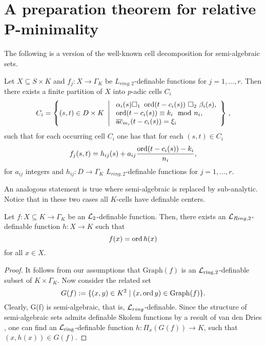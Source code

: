 \section{A preparation theorem for relative P-minimality}

The following is a version of the well-known cell decomposition for semi-algebraic sets. 

\begin{prop}\label{prop.celldecomp}
Let $X \subseteq  S \times K$ and $f_j:X \to\Gamma_K $ be $L_{ring,2}$-definable functions for $j=1,\ldots,r$. Then there exists a finite partition of $X$ into $p$-adic cells $C_i$ 
\[C_i = \left\{(s,t) \in D\times K \ \left| \ \begin{array}{l} \alpha_i(s) \square_1 \ \ord(t-c_i(s)) \ \square_2 \ \beta_i(s),\\ \ord(t-c_i(s)) \equiv k_i\mod n_i,\\ \ac_{m_i}(t-c_i(s)) = \xi_i \end{array} \right\}\right.,\]
such that for each occurring cell $C_i$ one has that for each $(s,t)\in C_i$
\[f_j(s,t)=  h_{ij}(s)+ a_{ij}\frac{\operatorname{ord}(t- c_i(s))- k_i}{n_i},
\]
for $a_{ij}$ integers and $h_{ij}: D\to \Gamma_K$ $L_{ring,2}$-definable functions for $j=1,\ldots,r$. 
\end{prop}

An analogous statement is true where semi-algebraic is replaced by sub-analytic. Notice that in these two cases all $K$-cells have definable centers. 

\begin{lem}\label{lem.semialgfnc}
Let $f: X \subseteq K \to \Gamma_K$ be an $\mathcal{L}_2$-definable function. Then, there exists an ${\mathcal L}_{Ring,2}$-definable function {$h: X\to K$} such that \[f(x) = \operatorname{ord} h(x)\] for all $x \in X$. 
\end{lem}
\begin{proof}

It follows from our assumptions that $\mathrm{Graph}(f)$ is an $\mathcal{L}_{\text{ring}, 2}$-definable subset of $K \times \Gamma_K$. Now consider the related set
\[ G(f) := \{(x,y) \in K^2 \mid (x, \operatorname{ord} y) \in \mathrm{Graph}(f)\}.\]
Clearly, G(f) is semi-algebraic, that is, ${\mathcal L}_{ring}$-definable. Since the structure of semi-algebraic sets admits definable Skolem functions by a result of van den Dries \cite{vdd-84}, one can find an $\mathcal{L}_{\text{ring}}$-definable function $h: \Pi_x(G(f)) \to K$, such that $(x, h(x)) \in G(f)$. 
\end{proof}

